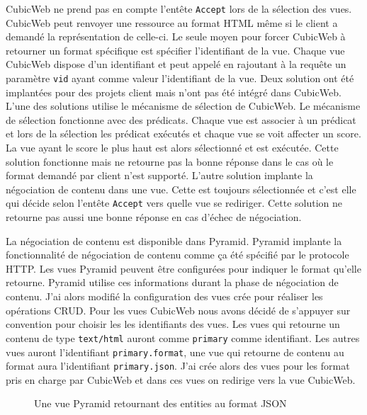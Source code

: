 CubicWeb ne prend pas en compte l'entête \texttt{Accept} lors de la sélection des vues. CubicWeb peut renvoyer une ressource au format HTML même si le client a demandé la représentation  de celle-ci. Le seule moyen pour forcer CubicWeb à retourner un format spécifique est spécifier l'identifiant de la vue. Chaque vue CubicWeb dispose d'un identifiant et peut appelé en rajoutant à la requête un paramètre \texttt{vid} ayant comme valeur l'identifiant de la vue. Deux solution ont été implantées pour des projets client mais n'ont pas été intégré dans CubicWeb. L'une des solutions utilise le mécanisme de sélection de CubicWeb. Le mécanisme de sélection fonctionne avec des prédicats. Chaque vue est associer à un prédicat et lors de la sélection les prédicat exécutés et chaque vue se voit affecter un score. La vue ayant le score le plus haut est alors sélectionné et est exécutée. Cette solution fonctionne mais ne retourne pas la bonne réponse dans le cas où le format demandé par client n'est supporté. L'autre solution implante la négociation de contenu dans une vue. Cette est toujours sélectionnée et c'est elle qui décide selon l'entête \texttt{Accept} vers quelle vue se rediriger. Cette solution ne retourne pas aussi une bonne réponse en cas d'échec de négociation.

La négociation de contenu est disponible dans Pyramid. Pyramid implante la fonctionnalité de négociation de contenu comme ça été spécifié par le protocole HTTP. Les vues Pyramid peuvent être configurées pour indiquer le format qu'elle retourne. Pyramid utilise ces informations durant la phase de négociation de contenu. J'ai alors modifié la configuration des vues crée pour réaliser les opérations CRUD. Pour les vues CubicWeb nous avons décidé de s'appuyer sur convention pour choisir les les identifiants des vues. Les vues qui retourne un contenu de type \texttt{text/html} auront comme \texttt{primary} comme identifiant. Les autres vues auront l'identifiant \texttt{primary.format}, une vue qui retourne de contenu au format  aura l'identifiant \texttt{primary.json}. J'ai crée alors des vues pour les format pris en charge par CubicWeb et dans ces vues on redirige vers la vue CubicWeb.   


\begin{figure}[htp]
    \centering
    \caption{Une vue Pyramid retournant des entities au format JSON}
    \label{fig:delete}
\end{figure}
